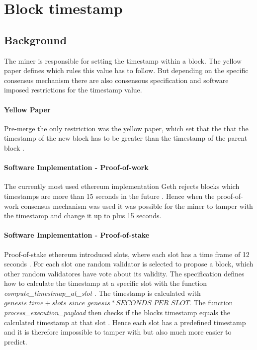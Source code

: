 \section{Block timestamp}

\subsection{Background} 
The miner is responsible for setting the timestamp within a block. The yellow
paper defines which rules this value has to follow. But depending on the
specific consensus mechanism there are also consensous specification and
software imposed restrictions for the timestamp value. 

\paragraph{Yellow Paper}
Pre-merge the only restriction was the yellow paper, which set that the that
the timestamp of the new block has to be greater than the timestamp of the
parent block \cite{ethyellowpaper2023}.

\paragraph{Software Implementation - Proof-of-work}
The currently most used ethereum implementation Geth rejects blocks which
timestamps are more than 15 seconds in the future
\cite{go-ethereum-15-sek-limit}. Hence when the proof-of-work consensus
mechanism was used it was possible for the miner to tamper
with the timestamp and change it up to plus 15 seconds.

\paragraph{Software Implementation - Proof-of-stake}
Proof-of-stake ethereum introduced slots, where each slot has a time frame of
12 seconds \cite{seconds-per-slot-mainnet}\cite{seconds-per-slot-mainnet-doc}.
For each slot one random validator is selected to propose a block, which other
random validatores have vote about its validity. The specification defines
how to calculate the timestamp at a specific slot with the function
\textit{compute\_timestmap\_at\_slot} \cite{compute-timestamp-at-slot}. The
timestamp is calculated with $genesis\_time + slots\_since\_genesis *
SECONDS\_PER\_SLOT$. The function \textit{process\_execution\_payload} then
checks if the blocks timestamp equals the calculated timestamp at that slot
\cite{process-execution-payload}. Hence each slot has a predefined timestamp
and it is therefore impossible to tamper with but also much more easier to
predict.



